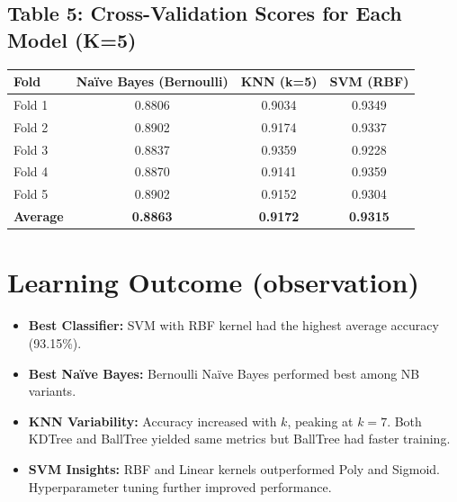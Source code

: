 \documentclass[12pt]{article}
\begin{document}
\subsection*{Table 5: Cross-Validation Scores for Each Model (K=5)}
\begin{center}
\begin{tabular}{lccc}
\toprule
\textbf{Fold} & \textbf{Naïve Bayes (Bernoulli)} & \textbf{KNN (k=5)} & \textbf{SVM (RBF)} \\
\midrule
Fold 1 & 0.8806 & 0.9034 & 0.9349 \\
Fold 2 & 0.8902 & 0.9174 & 0.9337 \\
Fold 3 & 0.8837 & 0.9359 & 0.9228 \\
Fold 4 & 0.8870 & 0.9141 & 0.9359 \\
Fold 5 & 0.8902 & 0.9152 & 0.9304 \\
\textbf{Average} & \textbf{0.8863} & \textbf{0.9172} & \textbf{0.9315} \\
\bottomrule
\end{tabular}
\end{center}

\section*{Learning Outcome (observation)}
\begin{itemize}
  \item \textbf{Best Classifier:} SVM with RBF kernel had the highest average accuracy (93.15\%).
  \item \textbf{Best Naïve Bayes:} Bernoulli Naïve Bayes performed best among NB variants.
  \item \textbf{KNN Variability:} Accuracy increased with $k$, peaking at $k=7$. Both KDTree and BallTree yielded same metrics but BallTree had faster training.
  \item \textbf{SVM Insights:} RBF and Linear kernels outperformed Poly and Sigmoid. Hyperparameter tuning further improved performance.
\end{itemize}
\end{document}

